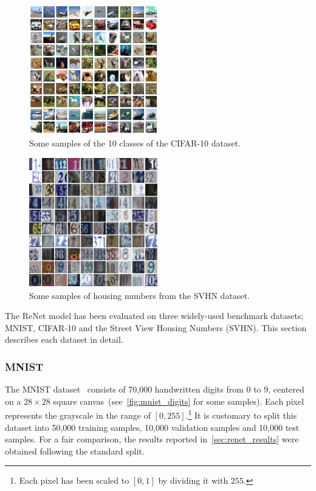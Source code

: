 \begin{figure}[!t]
    \centering
    \includegraphics[width=0.5\textwidth]{img/renet/cifar-10.png}
    \caption{Some samples of the 10 classes of the CIFAR-10 dataset.}
    \label{fig:cifar}
\end{figure}

\begin{figure}[!t]
    \centering
    \includegraphics[width=0.5\textwidth]{img/renet/SVHN.png}
    \caption{Some samples of housing numbers from the SVHN dataset.}
    \label{fig:svhn}
\end{figure}

The ReNet model has been evaluated on three widely-used benchmark datasets;
MNIST, CIFAR-10 and the Street View Housing Numbers (SVHN). This section
describes each dataset in detail.

\subsubsection{MNIST}
The MNIST dataset~\citep{Lecun99objectrecognition} consists of 70,000
handwritten digits from 0 to 9, centered on a $28\times 28$ square
canvas~(see~\autoref{fig:mnist_digits} for some samples). Each pixel represents
the grayscale in the range of $\left[0, 255\right]$.\footnote{Each pixel has
been scaled to $[0, 1]$ by dividing it with $255$.} It is customary to split
this dataset into 50,000 training samples, 10,000 validation samples and 10,000
test samples. For a fair comparison, the results reported
in~\autoref{sec:renet_results} were obtained following the standard split.


